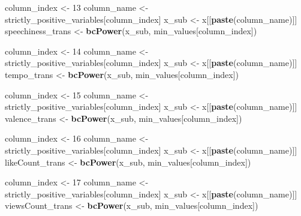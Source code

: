 \documentclass[
]{article}
\newenvironment{Shaded}{\begin{snugshade}}{\end{snugshade}}
\newcommand{\DecValTok}[1]{\textcolor[rgb]{0.00,0.00,0.81}{#1}}
\newcommand{\KeywordTok}[1]{\textcolor[rgb]{0.13,0.29,0.53}{\textbf{#1}}}
\newcommand{\NormalTok}[1]{#1}
\newcommand{\StringTok}[1]{\textcolor[rgb]{0.31,0.60,0.02}{#1}}
\begin{document}
\begin{Shaded}
\begin{Highlighting}[]
\NormalTok{column_index <-}\StringTok{ }\DecValTok{13}
\NormalTok{column_name <-}\StringTok{ }\NormalTok{strictly_positive_variables[column_index]}
\NormalTok{x_sub <-}\StringTok{ }\NormalTok{x[[}\KeywordTok{paste}\NormalTok{(column_name)]]}
\NormalTok{speechiness_trans <-}\StringTok{ }\KeywordTok{bcPower}\NormalTok{(x_sub, min_values[column_index])}

\NormalTok{column_index <-}\StringTok{ }\DecValTok{14}
\NormalTok{column_name <-}\StringTok{ }\NormalTok{strictly_positive_variables[column_index]}
\NormalTok{x_sub <-}\StringTok{ }\NormalTok{x[[}\KeywordTok{paste}\NormalTok{(column_name)]]}
\NormalTok{tempo_trans <-}\StringTok{ }\KeywordTok{bcPower}\NormalTok{(x_sub, min_values[column_index])}

\NormalTok{column_index <-}\StringTok{ }\DecValTok{15}
\NormalTok{column_name <-}\StringTok{ }\NormalTok{strictly_positive_variables[column_index]}
\NormalTok{x_sub <-}\StringTok{ }\NormalTok{x[[}\KeywordTok{paste}\NormalTok{(column_name)]]}
\NormalTok{valence_trans <-}\StringTok{ }\KeywordTok{bcPower}\NormalTok{(x_sub, min_values[column_index])}

\NormalTok{column_index <-}\StringTok{ }\DecValTok{16}
\NormalTok{column_name <-}\StringTok{ }\NormalTok{strictly_positive_variables[column_index]}
\NormalTok{x_sub <-}\StringTok{ }\NormalTok{x[[}\KeywordTok{paste}\NormalTok{(column_name)]]}
\NormalTok{likeCount_trans <-}\StringTok{ }\KeywordTok{bcPower}\NormalTok{(x_sub, min_values[column_index])}

\NormalTok{column_index <-}\StringTok{ }\DecValTok{17}
\NormalTok{column_name <-}\StringTok{ }\NormalTok{strictly_positive_variables[column_index]}
\NormalTok{x_sub <-}\StringTok{ }\NormalTok{x[[}\KeywordTok{paste}\NormalTok{(column_name)]]}
\NormalTok{viewsCount_trans <-}\StringTok{ }\KeywordTok{bcPower}\NormalTok{(x_sub, min_values[column_index])}
\end{Highlighting}
\end{Shaded}
\end{document}

